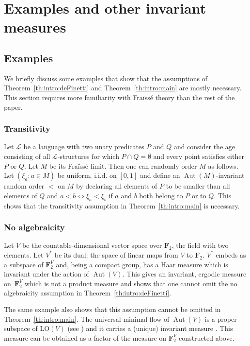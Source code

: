 \documentclass[11pt]{article}
\let\mathcal\mathscr
\theoremstyle{plain}
\theoremstyle{definition}
\newcommand{\bF}{{\mathbf F}}
\newcommand{\cL}{\mathcal{L}}
\DeclareMathOperator{\Aut}{Aut}
\newcommand{\LO}{\mathrm{LO}}
\begin{document}
\section{Examples and other invariant measures}
\label{sec:examples}

\subsection{Examples}
\label{sec:examples-1}

We briefly discuss some examples that show that the assumptions of Theorem~\ref{th:intro:deFinetti} and Theorem~\ref{th:intro:main} are mostly necessary. This section requires more familiarity with Fraïssé theory than the rest of the paper.\enlargethispage{.5\baselineskip}%

\subsubsection{Transitivity} Let $\cL$ be a language with two unary predicates $P$ and $Q$ and consider the age consisting of all $\cL$-structures for which $P \cap Q = \emptyset$ and every point satisfies either $P$ or $Q$. Let $M$ be its Fraïssé limit. Then one can randomly order $M$ as follows. Let $(\xi_a : a \in M)$ be uniform, i.i.d. on $[0, 1]$ and define an $\Aut(M)$-invariant random order $<$ on $M$ by declaring all elements of $P$ to be smaller than all elements of $Q$ and $a < b \iff \xi_a < \xi_b$ if $a$ and $b$ both belong to $P$ or to $Q$. This shows that the transitivity assumption in Theorem~\ref{th:intro:main} is necessary.

\subsubsection{No algebraicity} Let $V$ be the countable-dimensional vector space over $\bF_2$, the field with two elements. Let $V^*$ be its dual: the space of linear maps from $V$ to $\bF_2$. $V^*$ embeds as a subspace of $\bF_2^V$ and, being a compact group, has a Haar measure which is invariant under the action of $\Aut(V)$. This gives an invariant, ergodic measure on~$\bF_2^V$ which is not a product measure and shows that one cannot omit the no algebraicity assumption in Theorem~\ref{th:intro:deFinetti}.

The same example also shows that this assumption cannot be omitted in Theorem~\ref{th:intro:main}. The universal minimal flow of $\Aut(V)$ is a proper subspace of $\LO(V)$ (see \cite[Th.\,8.2]{Kechris2005}) and it carries a (unique) invariant measure \cite[\S10]{Angel2014}. This measure can be obtained as a factor of the measure on $\bF_2^V$ constructed above.
\end{document}
